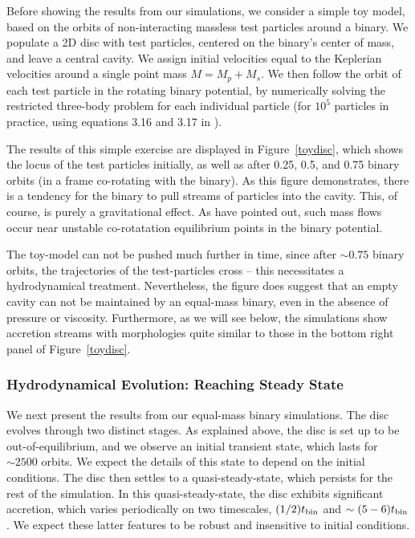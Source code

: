 Before showing the results from our simulations, we consider a simple
toy model, based on the orbits of non-interacting massless test
particles around a binary.  We populate a 2D disc with test particles,
centered on the binary's center of mass, and leave a central
cavity. We assign initial velocities equal to the Keplerian velocities
around a single point mass $M=M_p+M_s$.  We then follow the orbit of
each test particle in the rotating binary potential, by numerically
solving the restricted three-body problem for each individual particle
(for $10^5$ particles in practice, using equations 3.16 and 3.17 in
\citealt{MDbook}).

The results of this simple exercise are displayed in
Figure~\ref{toydisc}, which shows the locus of the test particles
initially, as well as after 0.25, 0.5, and 0.75 binary orbits (in a
frame co-rotating with the binary).  As this figure demonstrates,
there is a tendency for the binary to pull streams of particles into
the cavity.  This, of course, is purely a gravitational effect. As \citealt{ArtyLubow:1996} 
have pointed out, such mass flows occur near unstable 
co-rotatation equilibrium points in the binary potential. 

The toy-model can not be pushed much further in time, since after $\sim
0.75$ binary orbits, the trajectories of the test-particles cross --
this necessitates a hydrodynamical treatment.  Nevertheless, the
figure does suggest that an empty cavity can not be maintained by an
equal-mass binary, even in the absence of pressure or viscosity.
Furthermore, as we will see below, the simulations show accretion
streams with morphologies quite similar to those in the bottom right
panel of Figure~\ref{toydisc}.



\subsubsection{Hydrodynamical Evolution: Reaching Steady State}
\label{Hydrodynamical Evolution: Reaching Steady State}

We next present the results from our equal-mass binary
simulations. The disc evolves through two distinct stages.  As
explained above, the disc is set up to be out-of-equilibrium, and we
observe an initial transient state, which lasts for $\sim2500$ orbits.
We expect the details of this state to depend on the initial
conditions. The disc then settles to a quasi-steady-state, which
persists for the rest of the simulation.  In this quasi-steady-state,
the disc exhibits significant accretion, which varies periodically on
two timescales, $(1/2)t_{\rm{bin}}$ and $\sim (5 - 6)t_{\rm{bin}}$. We expect
these latter features to be robust and insensitive to initial
conditions.

